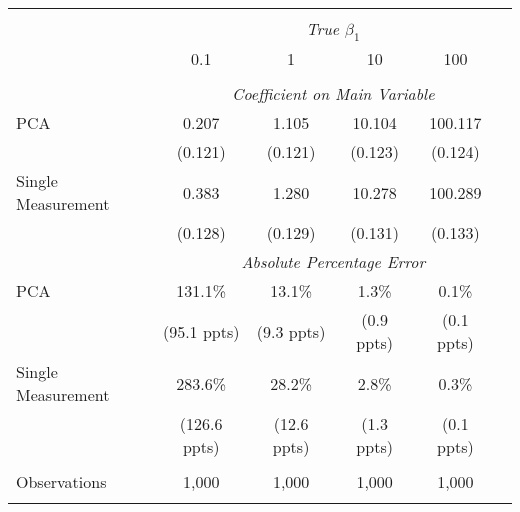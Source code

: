 \begin{table}[!htbp] \centering
\begin{tabular}{@{\extracolsep{5pt}}lccccc}
\\[-1.8ex]\hline
\hline \\[-1.8ex]
& \multicolumn{5}{c}{\textit{True $\beta_1$}} \
\cr 
\\[-1.8ex] & 0.1 & 1 & 10 & 100 \\
\hline \\[-1.8ex]
& \multicolumn{5}{c}{\textit{Coefficient on Main Variable}} \\
 PCA & 0.207 & 1.105 & 10.104 & 100.117  \\
  & (0.121) & (0.121) & (0.123) & (0.124)\\
  Single Measurement & 0.383 & 1.280 & 10.278 & 100.289  \\
  & (0.128) & (0.129) & (0.131) & (0.133)\\
& \multicolumn{5}{c}{\textit{Absolute Percentage Error}} \\
  PCA & 131.1\% & 13.1\% & 1.3\% & 0.1\%  \\
   & (95.1 ppts) & (9.3 ppts) & (0.9 ppts) & (0.1 ppts)\\
  Single Measurement & 283.6\% & 28.2\% & 2.8\% & 0.3\%  \\
  & (126.6 ppts) & (12.6 ppts) & (1.3 ppts) & (0.1 ppts)\\
\hline \\[-1.8ex]
 Observations & 1,000 & 1,000 & 1,000 & 1,000 &\\
\hline
\hline \\[-1.8ex]
\end{tabular}
\end{table}